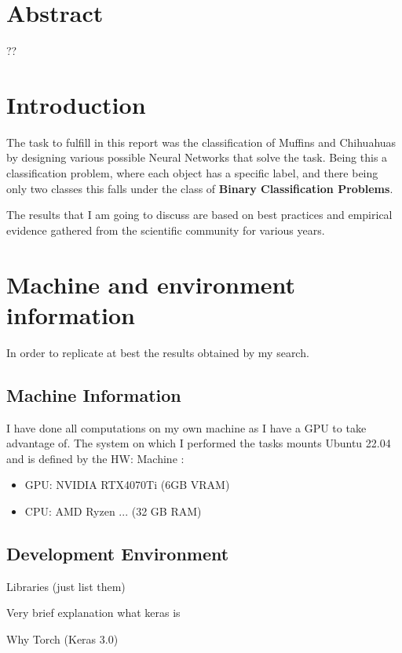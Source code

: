 \newpage
\section{Abstract}
??


\section{Introduction}
The task to fulfill in this report was the classification of Muffins and Chihuahuas
by designing various possible Neural Networks that solve the task. Being this a classification
problem, where each object has a specific label, and there being only two classes this
falls under the class of \textbf{Binary Classification Problems}.

The results that I am going to discuss are based on best practices and empirical
evidence gathered from the scientific community for various years.


\section{Machine and environment information}
In order to replicate at best the results obtained by my search.

\subsection{Machine Information}
I have done all computations on my own machine as I have a
GPU to take advantage of. The system on which I performed
the tasks mounts Ubuntu 22.04 and is defined by the HW:
Machine :
\begin{itemize}
    \item GPU: NVIDIA RTX4070Ti (6GB VRAM)
    \item CPU: AMD Ryzen ... (32 GB RAM)
\end{itemize}

\subsection{Development Environment}
Libraries (just list them)

Very brief explanation what keras is

Why Torch  (Keras 3.0)